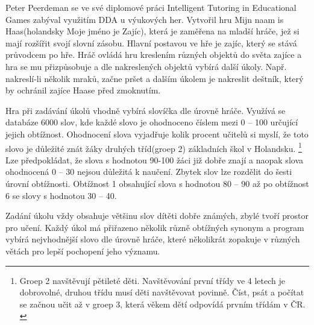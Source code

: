 Peter Peerdeman se ve své diplomové práci Intelligent Tutoring in Educational Games\cite{14Haas} zabýval využitím DDA u výukových her. Vytvořil hru Mijn naam is Haas(holandsky Moje jméno je Zajíc), která je zaměřena na mladší hráče, jež si mají rozšířit svojí slovní zásobu. Hlavní postavou ve hře je zajíc, který se stává průvodcem po hře. Hráč ovládá hru kreslením různých objektů do světa zajíce a hra se mu přizpůsobuje a dle nakreslených objektů vybírá další úkoly. Např. nakreslí-li několik mraků, začne pršet a dalším úkolem je nakreslit deštník, který by ochránil zajíce Haase před zmoknutím.

Hra při zadávání úkolů vhodně vybírá slovíčka dle úrovně hráče. Využívá se databáze 6000 slov, kde každé slovo je ohodnoceno číslem mezi 0 – 100 určující jejich obtížnost. Ohodnocení slova vyjadřuje kolik procent učitelů si myslí, že toto slovo je důležité znát žáky druhých tříd(groep  2)  základních škol v Holandsku. \footnote{Groep 2 navštěvují pětileté děti. Navštěvování první třídy ve 4 letech je dobrovolné, druhou třídu musí děti navštěvovat povinně. Číst, psát a počítat se začnou učit až v groep 3, která věkem dětí odpovídá prvním třídám v ČR. \cite{27EdHolland}} Lze předpokládat, že slova s hodnotou 90-100 žáci již dobře znají a naopak slova ohodnocená 0 – 30 nejsou důležitá k naučení. Zbytek slov lze rozdělit do šesti úrovní obtížnosti. Obtížnost 1 obsahující slova s hodnotou 80 – 90 až po obtížnost 6 se slovy s hodnotou 30 – 40.

Zadání úkolu vždy obsahuje většinu slov dítěti dobře známých, zbylé tvoří prostor pro učení. Každý úkol má přiřazeno několik různě obtížných synonym a program vybírá nejvhodnější slovo dle úrovně hráče, které několikrát zopakuje v různých větách pro lepší pochopení jeho významu.

\endinput
